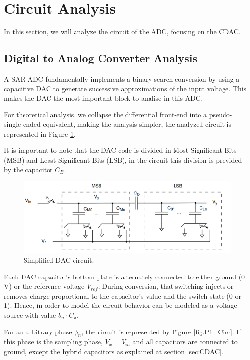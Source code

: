 \section{Circuit Analysis}
\label{sec:circuit_analysis}

In this section, we will analyze the circuit of the ADC, focusing on the CDAC.

\subsection{Digital to Analog Converter Analysis}

A SAR ADC fundamentally implements a binary-search conversion by using a capacitive DAC to generate successive approximations of the input voltage. This makes the DAC the most important block to analise in this ADC. 

For theoretical analysis, we collapse the differential front-end into a pseudo-single-ended equivalent, making the analysis simpler, the analyzed circuit is represented in Figure \ref{fig:DAC_Circ}. 

It is important to note that the DAC code is divided in Most Significant Bits (MSB) and Least Significant Bits (LSB), in the circuit this division is provided by the capacitor $C_B$.

\begin{figure}[H]
    \centering
    \includegraphics*[scale = 0.35]{Images/DacCirc.png}
    \caption{Simplified DAC circuit.}
    \label{fig:DAC_Circ}
\end{figure}

Each DAC capacitor's bottom plate is alternately connected to either ground (0 V) or the reference voltage $V_{ref}$. During conversion, that switching injects or removes charge proportional to the capacitor's value and the switch state (0 or 1). Hence, in order to model the circuit behavior can be modeled as a voltage source with value $b_n\cdot C_n$. 


For an arbitrary phase $\phi_n$, the circuit is represented by Figure \ref{fig:P1_Circ}. If this phase is the sampling phase, $V_x = V_{in}$ and all capacitors are connected to ground, except the hybrid capacitors as explained at section \ref{sec:CDAC}.

